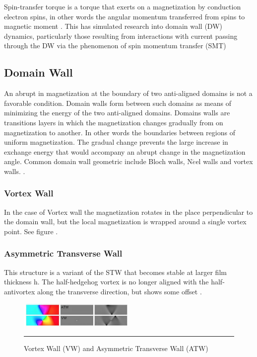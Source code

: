 Spin-transfer torque is a torque that exerts on a magnetization by conduction electron spins, in other words the angular momentum transferred from spins to magnetic  moment \cite{zhang}.
This has simulated research into domain wall (DW) dynamics, particularly those resulting from interactions with current passing through the DW via the phenomenon of spin momentum transfer (SMT) \cite{handbookspin}


\cite{ferro}

\subsection{Domain Wall}

An abrupt in magnetization at the boundary of two anti-aligned domains is not a favorable condition. Domain walls form between such domains as means of minimizing the energy of the two anti-aligned domains. Domains walls are transitions layers in which the magnetization changes gradually from on magnetization to another. In other words the boundaries between regions of uniform magnetization.  The gradual change prevents the large increase in exchange energy that would accompany an abrupt change in the magnetization angle. Common domain wall geometric include Bloch walls, N$\acute{e}$el walls and vortex walls.  \cite{spindomain}.


\subsubsection{Vortex Wall} In the case of Vortex wall the magnetization rotates in the place perpendicular to the domain wall, but the local magnetization is wrapped around a single vortex point. See figure \label{eq:kg4}.

\subsubsection{Asymmetric Transverse Wall}

This structure is a variant of the STW that becomes stable at larger film thickness h.
The half-hedgehog vortex is no longer aligned with the half-antivortex along the
transverse direction, but shows some offset \label{eq:kg4}.

\begin{figure}[htbp]
	\centering
		\includegraphics[width=0.5\textwidth]{Figures/dw.png}
		\rule{35em}{0.5pt}
	\caption[Domain Wall VW, ATW]{Vortex Wall (VW) and Asymmetric Transverse Wall (ATW)}
	\label{fig:dw}
\end{figure}


